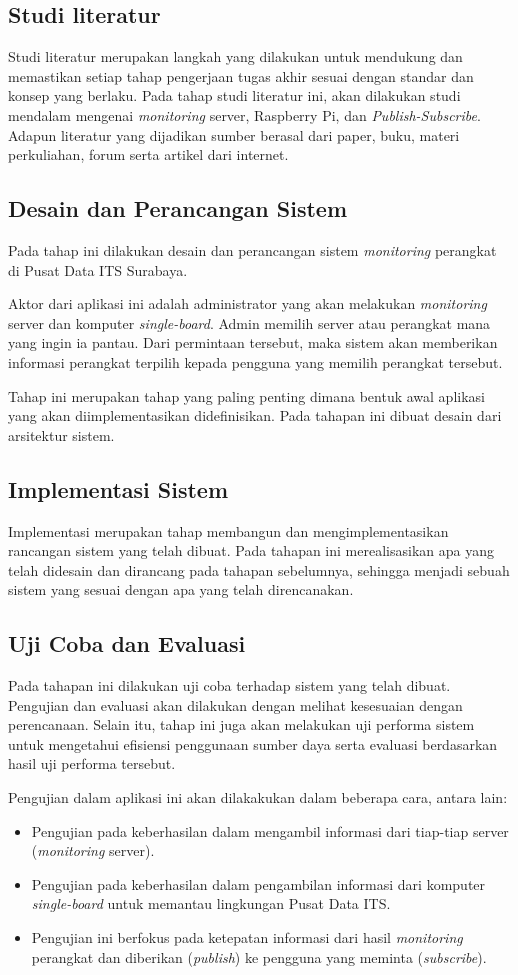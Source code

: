 \subsection{Studi literatur}
Studi literatur merupakan langkah yang dilakukan untuk mendukung dan memastikan setiap tahap pengerjaan tugas akhir sesuai dengan standar dan konsep yang berlaku. Pada tahap studi literatur ini, akan dilakukan studi mendalam mengenai \textit{monitoring} server, Raspberry Pi, dan \textit{Publish-Subscribe}. Adapun literatur yang dijadikan sumber berasal dari paper, buku, materi perkuliahan, forum serta artikel dari internet.
\subsection{Desain dan Perancangan Sistem}
Pada tahap ini dilakukan desain dan perancangan sistem \textit{monitoring} perangkat di Pusat Data ITS Surabaya.

Aktor dari aplikasi ini adalah administrator yang akan melakukan \textit{monitoring} server dan komputer \textit{single-board}. Admin memilih server atau perangkat mana yang ingin ia pantau. Dari permintaan tersebut, maka sistem akan memberikan informasi perangkat terpilih kepada pengguna yang memilih perangkat tersebut.

Tahap ini merupakan tahap yang paling penting dimana bentuk awal aplikasi yang akan diimplementasikan didefinisikan. Pada tahapan ini dibuat desain dari arsitektur sistem.
\subsection{Implementasi Sistem}
Implementasi merupakan tahap membangun dan  mengimplementasikan rancangan sistem yang telah dibuat. Pada tahapan ini merealisasikan apa yang telah didesain dan dirancang pada tahapan sebelumnya, sehingga menjadi sebuah sistem yang sesuai dengan apa yang telah direncanakan.
\subsection{Uji Coba dan Evaluasi}
Pada tahapan ini dilakukan uji coba terhadap sistem yang telah dibuat. Pengujian dan evaluasi akan dilakukan dengan melihat kesesuaian dengan perencanaan. Selain itu, tahap ini juga akan melakukan uji performa sistem untuk mengetahui efisiensi penggunaan sumber daya serta evaluasi berdasarkan hasil uji performa tersebut.

Pengujian dalam aplikasi ini akan dilakakukan dalam beberapa cara, antara lain:
\begin{itemize}
	\item Pengujian pada keberhasilan dalam mengambil informasi dari tiap-tiap server (\textit{monitoring} server).
	\item Pengujian pada keberhasilan dalam pengambilan informasi dari komputer \textit{single-board} untuk memantau lingkungan Pusat Data ITS.
	\item Pengujian ini berfokus pada ketepatan informasi dari hasil \textit{monitoring} perangkat dan diberikan (\textit{publish}) ke pengguna yang meminta (\textit{subscribe}).
\end{itemize}
